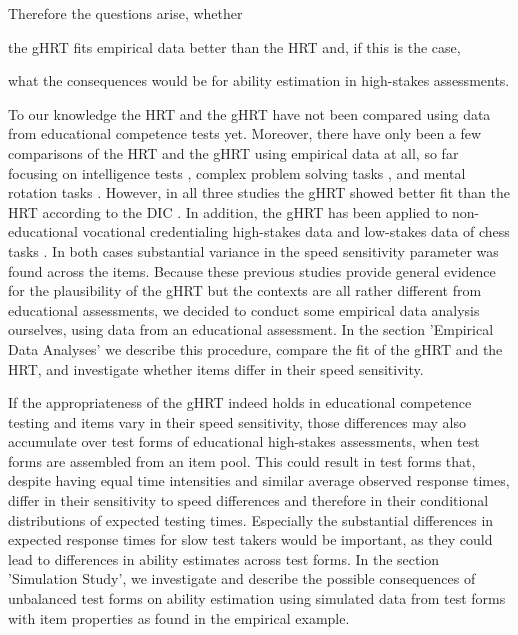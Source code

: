 \documentclass[a4paper,man,apacite,floatsintext,donotrepeattitle]{apa6}
\begin{document}
Therefore the questions arise, whether
\begin{seriate} 
\item the gHRT fits empirical data better than the HRT and, if this is the case,
\item what the consequences would be for ability estimation in high-stakes assessments. 
\end{seriate}
To our knowledge the HRT and the gHRT have not been compared using data from educational competence tests yet. Moreover, there have only been a few comparisons of the HRT and the gHRT using empirical data at all, so far focusing on intelligence tests \cite{Goldhammer.2011}, complex problem solving tasks \cite{Scherer.2015}, and mental rotation tasks \cite{Debelak.2014}. However, in all three studies the gHRT showed better fit than the HRT according to the DIC \cite{Spiegelhalter.2002}. In addition, the gHRT has been applied to non-educational vocational credentialing high-stakes data \cite{Fox.2017} and low-stakes data of chess tasks \cite{Fox.2016}. In both cases substantial variance in the speed sensitivity parameter was found across the items. Because these previous studies provide general evidence for the plausibility of the gHRT but the contexts are all rather different from educational assessments, we decided to conduct some empirical data analysis ourselves, using data from an educational assessment. In the section 'Empirical Data Analyses' we describe this procedure, compare the fit of the gHRT and the HRT, and investigate whether items differ in their speed sensitivity.

If the appropriateness of the gHRT indeed holds in educational competence testing and items vary in their speed sensitivity, those differences may also accumulate over test forms of educational high-stakes assessments, when test forms are assembled from an item pool. This could result in test forms that, despite having equal time intensities and similar average observed response times, differ in their sensitivity to speed differences and therefore in their conditional distributions of expected testing times. Especially the substantial differences in expected response times for slow test takers would be important, as they could lead to differences in ability estimates across test forms.  In the section 'Simulation Study', we investigate and describe the possible consequences of unbalanced test forms on ability estimation using simulated data from test forms with item properties as found in the empirical example.
\end{document}
